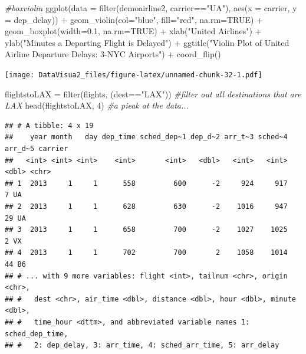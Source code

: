 \documentclass[
]{article}
\newenvironment{Shaded}{\begin{snugshade}}{\end{snugshade}}
\newcommand{\AttributeTok}[1]{\textcolor[rgb]{0.77,0.63,0.00}{#1}}
\newcommand{\CommentTok}[1]{\textcolor[rgb]{0.56,0.35,0.01}{\textit{#1}}}
\newcommand{\ConstantTok}[1]{\textcolor[rgb]{0.00,0.00,0.00}{#1}}
\newcommand{\DecValTok}[1]{\textcolor[rgb]{0.00,0.00,0.81}{#1}}
\newcommand{\FloatTok}[1]{\textcolor[rgb]{0.00,0.00,0.81}{#1}}
\newcommand{\FunctionTok}[1]{\textcolor[rgb]{0.00,0.00,0.00}{#1}}
\newcommand{\NormalTok}[1]{#1}
\newcommand{\OtherTok}[1]{\textcolor[rgb]{0.56,0.35,0.01}{#1}}
\newcommand{\SpecialCharTok}[1]{\textcolor[rgb]{0.00,0.00,0.00}{#1}}
\newcommand{\StringTok}[1]{\textcolor[rgb]{0.31,0.60,0.02}{#1}}
\begin{document}
\begin{Shaded}
\begin{Highlighting}[]
\CommentTok{\#boxviolin}
\FunctionTok{ggplot}\NormalTok{(}\AttributeTok{data =} \FunctionTok{filter}\NormalTok{(demoairline2, carrier}\SpecialCharTok{==}\StringTok{"UA"}\NormalTok{), }\FunctionTok{aes}\NormalTok{(}\AttributeTok{x =}\NormalTok{ carrier, }\AttributeTok{y =}\NormalTok{ dep\_delay)) }\SpecialCharTok{+} \FunctionTok{geom\_violin}\NormalTok{(}\AttributeTok{col=}\StringTok{"blue"}\NormalTok{, }\AttributeTok{fill=}\StringTok{"red"}\NormalTok{, }\AttributeTok{na.rm=}\ConstantTok{TRUE}\NormalTok{) }\SpecialCharTok{+} \FunctionTok{geom\_boxplot}\NormalTok{(}\AttributeTok{width=}\FloatTok{0.1}\NormalTok{, }\AttributeTok{na.rm=}\ConstantTok{TRUE}\NormalTok{) }\SpecialCharTok{+} \FunctionTok{xlab}\NormalTok{(}\StringTok{"United Airlines"}\NormalTok{) }\SpecialCharTok{+} \FunctionTok{ylab}\NormalTok{(}\StringTok{"Minutes a Departing Flight is Delayed"}\NormalTok{) }\SpecialCharTok{+} \FunctionTok{ggtitle}\NormalTok{(}\StringTok{"Violin Plot of United Airline Departure Delays: 3{-}NYC Airports"}\NormalTok{) }\SpecialCharTok{+} \FunctionTok{coord\_flip}\NormalTok{()}
\end{Highlighting}
\end{Shaded}

\texttt{[image: DataVisua2\_files/figure-latex/unnamed-chunk-32-1.pdf]}

\begin{Shaded}
\begin{Highlighting}[]
\NormalTok{flightstoLAX }\OtherTok{=} \FunctionTok{filter}\NormalTok{(flights, (dest}\SpecialCharTok{==}\StringTok{"LAX"}\NormalTok{)) }\CommentTok{\#filter out all destinations that are LAX}
\FunctionTok{head}\NormalTok{(flightstoLAX, }\DecValTok{4}\NormalTok{) }\CommentTok{\#a pieak at the data...}
\end{Highlighting}
\end{Shaded}

\begin{verbatim}
## # A tibble: 4 x 19
##    year month   day dep_time sched_dep~1 dep_d~2 arr_t~3 sched~4 arr_d~5 carrier
##   <int> <int> <int>    <int>       <int>   <dbl>   <int>   <int>   <dbl> <chr>  
## 1  2013     1     1      558         600      -2     924     917       7 UA     
## 2  2013     1     1      628         630      -2    1016     947      29 UA     
## 3  2013     1     1      658         700      -2    1027    1025       2 VX     
## 4  2013     1     1      702         700       2    1058    1014      44 B6     
## # ... with 9 more variables: flight <int>, tailnum <chr>, origin <chr>,
## #   dest <chr>, air_time <dbl>, distance <dbl>, hour <dbl>, minute <dbl>,
## #   time_hour <dttm>, and abbreviated variable names 1: sched_dep_time,
## #   2: dep_delay, 3: arr_time, 4: sched_arr_time, 5: arr_delay
\end{verbatim}
\end{document}
